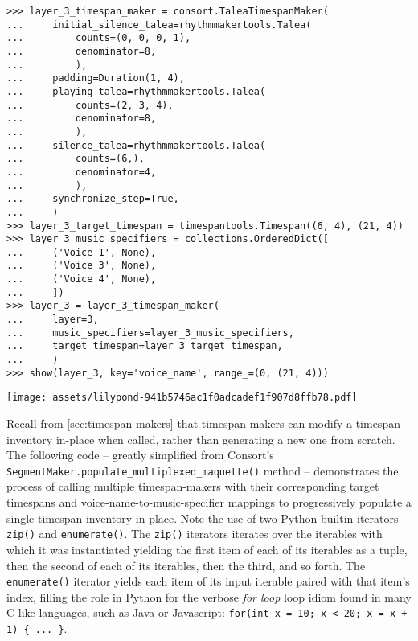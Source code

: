 \begin{abjadbookoutput}
\begin{singlespacing}
\vspace{-0.5\baselineskip}
\begin{lstlisting}
>>> layer_3_timespan_maker = consort.TaleaTimespanMaker(
...     initial_silence_talea=rhythmmakertools.Talea(
...         counts=(0, 0, 0, 1),
...         denominator=8,
...         ),
...     padding=Duration(1, 4),
...     playing_talea=rhythmmakertools.Talea(
...         counts=(2, 3, 4),
...         denominator=8,
...         ),
...     silence_talea=rhythmmakertools.Talea(
...         counts=(6,),
...         denominator=4,
...         ),
...     synchronize_step=True,
...     )
>>> layer_3_target_timespan = timespantools.Timespan((6, 4), (21, 4))
>>> layer_3_music_specifiers = collections.OrderedDict([
...     ('Voice 1', None),
...     ('Voice 3', None),
...     ('Voice 4', None),
...     ])
>>> layer_3 = layer_3_timespan_maker(
...     layer=3,
...     music_specifiers=layer_3_music_specifiers,
...     target_timespan=layer_3_target_timespan,
...     )
>>> show(layer_3, key='voice_name', range_=(0, (21, 4)))
\end{lstlisting}
\noindent\texttt{[image: assets/lilypond-941b5746ac1f0adcadef1f907d8ffb78.pdf]}
\end{singlespacing}
\end{abjadbookoutput}

\noindent Recall from \autoref{sec:timespan-makers} that timespan-makers can
modify a timespan inventory in-place when called, rather than generating a new
one from scratch. The following code -- greatly simplified from Consort's
\texttt{SegmentMaker.populate\_multiplexed\_maquette()} method -- demonstrates
the process of calling multiple timespan-makers with their corresponding target
timespans and voice-name-to-music-specifier mappings to progressively populate
a single timespan inventory in-place. Note the use of two Python builtin
iterators \texttt{zip()} and \texttt{enumerate()}. The \texttt{zip()} iterators
iterates over the iterables with which it was instantiated yielding the first
item of each of its iterables as a tuple, then the second of each of its
iterables, then the third, and so forth. The \texttt{enumerate()} iterator
yields each item of its input iterable paired with that item's index, filling
the role in Python for the verbose \emph{for loop} loop idiom found in many
C-like languages, such as Java or Javascript: \texttt{for(int x = 10; x < 20; x
= x + 1) \{ ... \}}.

